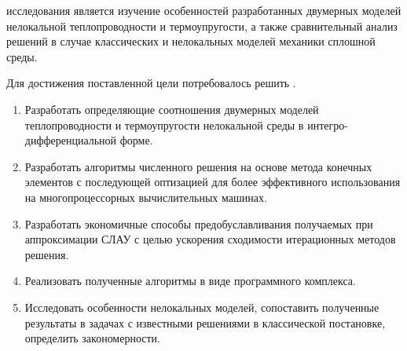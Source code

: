 

{\aim} исследования является изучение особенностей разработанных двумерных моделей нелокальной теплопроводности и термоупругости, а также сравнительный анализ решений в случае классических и нелокальных моделей механики сплошной среды.

Для достижения поставленной цели потребовалось решить {\tasks}.
\begin{enumerate}[beginpenalty=10000] %
  \item Разработать определяющие соотношения двумерных моделей теплопроводности и термоупругости нелокальной среды в интегро-дифференциальной форме.
  \item Разработать алгоритмы численного решения на основе метода конечных элементов с последующей оптизацией для более эффективного использования на многопроцессорных вычислительных машинах.
  \item Разработать экономичные способы предобуславливания получаемых при аппроксимации СЛАУ с целью ускорения сходимости итерационных методов решения.
  \item Реализовать полученные алгоритмы в виде программного комплекса.
  \item Исследовать особенности нелокальных моделей, сопоставить полученные результаты в задачах с известными решениями в классической постановке, определить закономерности.
\end{enumerate}


